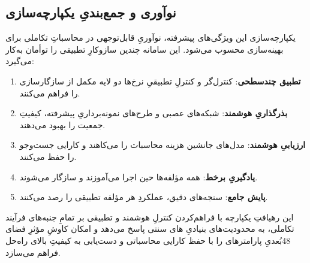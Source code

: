\subsection{نوآوری و جمع‌بندیِ یکپارچه‌سازی}

یکپارچه‌سازی این ویژگی‌های پیشرفته، نوآوریِ قابل‌توجهی در محاسباتِ تکاملی برای بهینه‌سازی  محسوب می‌شود. این سامانه چندین سازوکارِ تطبیقی را توأمان به‌کار می‌گیرد:
\begin{enumerate}
\item \textbf{تطبیق چندسطحی}: کنترل‌گر  و کنترلِ تطبیقیِ نرخ‌ها دو لایه مکمل از سازگارسازی را فراهم می‌کنند.
\item \textbf{بذرگذاریِ هوشمند}: شبکه‌های عصبی و طرح‌های نمونه‌برداریِ پیشرفته، کیفیتِ جمعیت را بهبود می‌دهند.
\item \textbf{ارزیابیِ هوشمند}: مدل‌های جانشین هزینه محاسبات را می‌کاهند و کارایی جست‌وجو را حفظ می‌کنند.
\item \textbf{یادگیریِ برخط}: همه مؤلفه‌ها حین اجرا می‌آموزند و سازگار می‌شوند.
\item \textbf{پایش جامع}: سنجه‌های دقیق، عملکردِ هر مؤلفه تطبیقی را رصد می‌کنند.
\end{enumerate}

این رهیافتِ یکپارچه با فراهم‌کردن کنترلِ هوشمند و تطبیقی بر تمامِ جنبه‌های فرآیند تکاملی، به محدودیت‌های بنیادیِ ‌های سنتی پاسخ می‌دهد و امکان کاوشِ مؤثرِ فضای 48بُعدیِ پارامترهای  را با حفظ کارایی محاسباتی و دست‌یابی به کیفیتِ بالای راه‌حل فراهم می‌سازد.
